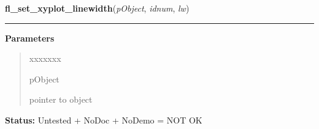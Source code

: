    \label{xformslib:library:fl_set_xyplot_linewidth}

    \vspace{0.5ex}

\hspace{.8\funcindent}\begin{boxedminipage}{\funcwidth}

    \raggedright \textbf{fl\_set\_xyplot\_linewidth}(\textit{pObject}, \textit{idnum}, \textit{lw})

    \vspace{-1.5ex}

    \rule{\textwidth}{0.5\fboxrule}
\setlength{\parskip}{2ex}
\setlength{\parskip}{1ex}
      \textbf{Parameters}
      \vspace{-1ex}

      \begin{quote}
        \begin{Ventry}{xxxxxxx}

          \item[pObject]

          pointer to object

        \end{Ventry}

      \end{quote}

\textbf{Status:} Untested + NoDoc + NoDemo = NOT OK



    \end{boxedminipage}

    \label{xformslib:library:fl_set_xyplot_xgrid}

    \vspace{0.5ex}

